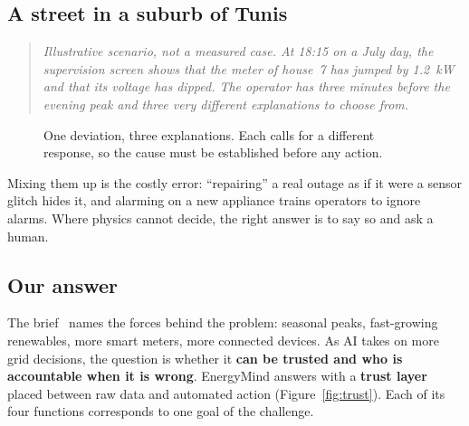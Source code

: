 \subsection{A street in a suburb of Tunis}
\begin{quote}\itshape\small
Illustrative scenario, not a measured case. At 18:15 on a July day, the supervision screen shows that the meter of house~7 has jumped by 1.2~kW and that its voltage has dipped. The operator has three minutes before the evening peak and three very different explanations to choose from.
\end{quote}
\begin{figure}[!h]
\centering
{}
\caption{One deviation, three explanations. Each calls for a different response, so the cause must be established before any action.}
\end{figure}
Mixing them up is the costly error: ``repairing'' a real outage as if it were a sensor glitch hides it, and alarming on a new appliance trains operators to ignore alarms. Where physics cannot decide, the right answer is to say so and ask a human.

\subsection{Our answer}
The brief~\cite{brief} names the forces behind the problem: seasonal peaks, fast-growing renewables, more smart meters, more connected devices. As AI takes on more grid decisions, the question is whether it \textbf{can be trusted and who is accountable when it is wrong}. EnergyMind answers with a \textbf{trust layer} placed between raw data and automated action (Figure~\ref{fig:trust}). Each of its four functions corresponds to one goal of the challenge.

